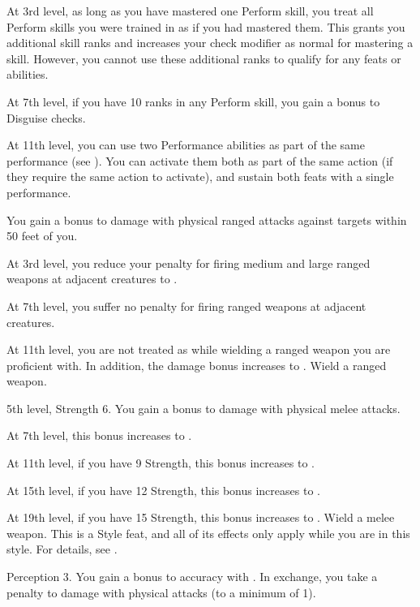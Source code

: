     At 3rd level, as long as you have mastered one Perform skill, you treat all Perform skills you were trained in as if you had mastered them.
    This grants you additional skill ranks and increases your check modifier as normal for mastering a skill.
    However, you cannot use these additional ranks to qualify for any feats or abilities.

    At 7th level, if you have 10 ranks in any Perform skill, you gain a  bonus to Disguise checks.

    At 11th level, you can use two Performance abilities as part of the same performance (see ).
    You can activate them both as part of the same action (if they require the same action to activate), and sustain both feats with a single performance.

    \featben You gain a  bonus to damage with physical ranged attacks against targets within 50 feet of you.

    At 3rd level, you reduce your penalty for firing medium and large ranged weapons at adjacent creatures to .

    At 7th level, you suffer no penalty for firing ranged weapons at adjacent creatures.

    At 11th level, you are not treated as  while wielding a ranged weapon you are proficient with.
    In addition, the damage bonus increases to .
    \stylereq Wield a ranged weapon.

    \featpres 5th level, Strength 6.
    \featben You gain a  bonus to damage with physical melee attacks.

    At 7th level, this bonus increases to .

    At 11th level, if you have 9 Strength, this bonus increases to .

    At 15th level, if you have 12 Strength, this bonus increases to .

    At 19th level, if you have 15 Strength, this bonus increases to .
    \stylereq Wield a melee weapon.
     This is a Style feat, and all of its effects only apply while you are in this style.
    For details, see .

    \featpres Perception 3.
    \featben You gain a  bonus to accuracy with .
    In exchange, you take a  penalty to damage with physical attacks (to a minimum of 1).

